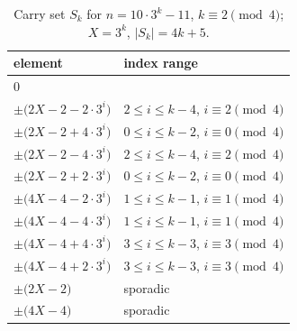 \begin{table}[htbp]\centering\small
\caption{Carry set $S_k$ for $n=10\cdot 3^k - 11$, $k\equiv 2\pmod{4}$; $X=3^k$, $|S_k|=4k+5$.}
\begin{tabular}{ll}\toprule
element & index range \\ \midrule
$0$ & \\
$\pm\bigl(2X - 2 - 2\cdot 3^i\bigr)$ & $2\le i\le k-4$, $i\equiv 2\pmod 4$ \\
$\pm\bigl(2X - 2 + 4\cdot 3^i\bigr)$ & $0\le i\le k-2$, $i\equiv 0\pmod 4$ \\
$\pm\bigl(2X - 2 - 4\cdot 3^i\bigr)$ & $2\le i\le k-4$, $i\equiv 2\pmod 4$ \\
$\pm\bigl(2X - 2 + 2\cdot 3^i\bigr)$ & $0\le i\le k-2$, $i\equiv 0\pmod 4$ \\
$\pm\bigl(4X - 4 - 2\cdot 3^i\bigr)$ & $1\le i\le k-1$, $i\equiv 1\pmod 4$ \\
$\pm\bigl(4X - 4 - 4\cdot 3^i\bigr)$ & $1\le i\le k-1$, $i\equiv 1\pmod 4$ \\
$\pm\bigl(4X - 4 + 4\cdot 3^i\bigr)$ & $3\le i\le k-3$, $i\equiv 3\pmod 4$ \\
$\pm\bigl(4X - 4 + 2\cdot 3^i\bigr)$ & $3\le i\le k-3$, $i\equiv 3\pmod 4$ \\
$\pm\bigl(2X - 2\bigr)$ & sporadic \\
$\pm\bigl(4X - 4\bigr)$ & sporadic \\
\bottomrule\end{tabular}\end{table}

